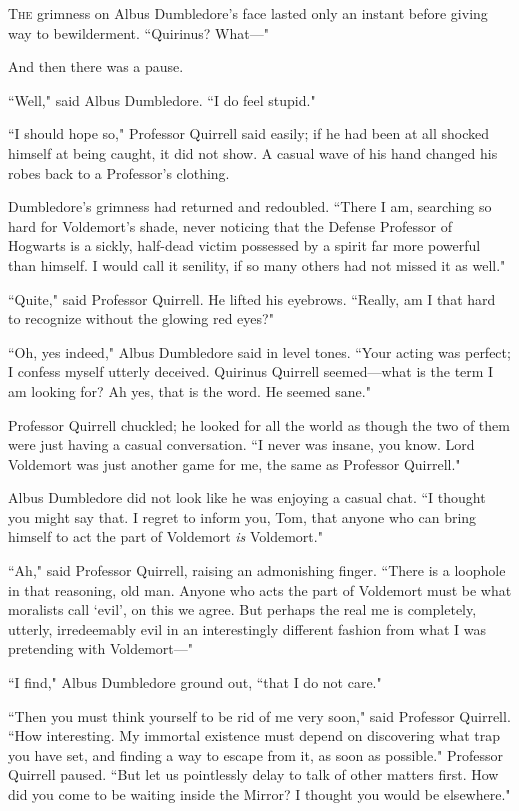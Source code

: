 
\lettrine{T}{he} grimness on Albus Dumbledore's face lasted only an instant before giving way to bewilderment. ``Quirinus? What—"

And then there was a pause.

``Well," said Albus Dumbledore. ``I do feel stupid."

``I should hope so," Professor Quirrell said easily; if he had been at all shocked himself at being caught, it did not show. A casual wave of his hand changed his robes back to a Professor's clothing.

Dumbledore's grimness had returned and redoubled. ``There I am, searching so hard for Voldemort's shade, never noticing that the Defense Professor of Hogwarts is a sickly, half-dead victim possessed by a spirit far more powerful than himself. I would call it senility, if so many others had not missed it as well."

``Quite," said Professor Quirrell. He lifted his eyebrows. ``Really, am I that hard to recognize without the glowing red eyes?"

``Oh, yes indeed," Albus Dumbledore said in level tones. ``Your acting was perfect; I confess myself utterly deceived. Quirinus Quirrell seemed—what is the term I am looking for? Ah yes, that is the word. He seemed sane."

Professor Quirrell chuckled; he looked for all the world as though the two of them were just having a casual conversation. ``I never was insane, you know. Lord Voldemort was just another game for me, the same as Professor Quirrell."

Albus Dumbledore did not look like he was enjoying a casual chat. ``I thought you might say that. I regret to inform you, Tom, that anyone who can bring himself to act the part of Voldemort \emph{is} Voldemort."

``Ah," said Professor Quirrell, raising an admonishing finger. ``There is a loophole in that reasoning, old man. Anyone who acts the part of Voldemort must be what moralists call `evil', on this we agree. But perhaps the real me is completely, utterly, irredeemably evil in an interestingly different fashion from what I was pretending with Voldemort—"

``I find," Albus Dumbledore ground out, ``that I do not care."

``Then you must think yourself to be rid of me very soon," said Professor Quirrell. ``How interesting. My immortal existence must depend on discovering what trap you have set, and finding a way to escape from it, as soon as possible." Professor Quirrell paused. ``But let us pointlessly delay to talk of other matters first. How did you come to be waiting inside the Mirror? I thought you would be elsewhere."

